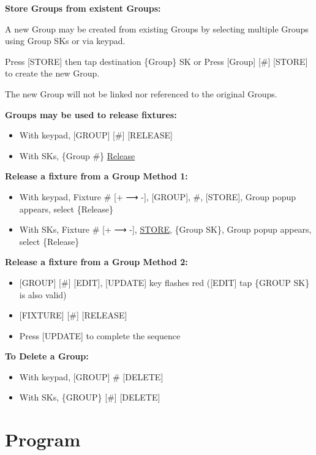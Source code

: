 \documentclass[
]{article}
\begin{document}
\textbf{Store Groups from existent Groups:}

A new Group may be created from existing Groups by selecting multiple Groups using Group SKs or via keypad.

Press {[}STORE{]} then tap destination \{Group\} SK or Press {[}Group{]} {[}\#{]} {[}STORE{]} to create the new Group.

The new Group will not be linked nor referenced to the original Groups.

\textbf{Groups may be used to release fixtures:}

\begin{itemize}
\item
  With keypad, {[}GROUP{]} {[}\#{]} {[}RELEASE{]}
\item
  With SKs, \{Group \#\} \protect\hyperlink{release}{Release}
\end{itemize}

\textbf{Release a fixture from a Group Method 1:}

\begin{itemize}
\item
  With keypad, Fixture \# {[}+ ⟶ -{]}, {[}GROUP{]}, \#, {[}STORE{]}, Group popup appears, select \{Release\}
\item
  With SKs, Fixture \# {[}+ ⟶ -{]}, \protect\hyperlink{store}{STORE}, \{Group SK\}, Group popup appears, select \{Release\}
\end{itemize}

\textbf{Release a fixture from a Group Method 2:}

\begin{itemize}
\item
  {[}GROUP{]} {[}\#{]} {[}EDIT{]}, {[}UPDATE{]} key flashes red ({[}EDIT{]} tap \{GROUP SK\} is also valid)
\item
  {[}FIXTURE{]} {[}\#{]} {[}RELEASE{]}
\item
  Press {[}UPDATE{]} to complete the sequence
\end{itemize}

\textbf{To Delete a Group:}

\begin{itemize}
\item
  With keypad, {[}GROUP{]} \# {[}DELETE{]}
\item
  With SKs, \{GROUP\} {[}\#{]} {[}DELETE{]}
\end{itemize}

\hypertarget{program}{%
\section{Program}\label{program}}
\end{document}
